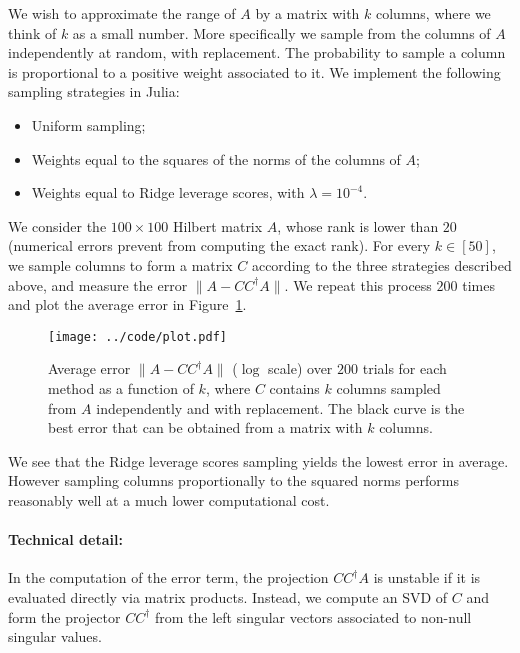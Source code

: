 \documentclass{article}
\begin{document}
We wish to approximate the range of $A$ by a matrix with $k$ columns, where we
think of $k$ as a small number.
More specifically we sample from the columns of $A$ independently at random,
with replacement.
The probability to sample a column is proportional to a positive weight
associated to it.
We implement the following sampling strategies in Julia:
\begin{itemize}
\item Uniform sampling;
\item Weights equal to the squares of the norms of the columns of $A$;
\item Weights equal to Ridge leverage scores, with $\lambda = 10^{-4}$.
\end{itemize}
We consider the $100 \times 100$ Hilbert matrix $A$, whose rank is lower than
$20$ (numerical errors prevent from computing the exact rank).
For every $k \in [50]$, we sample columns to form a matrix $C$ according to the
three strategies described above, and measure the error $\|A - C C^\dagger A\|$.
We repeat this process $200$ times and plot the average error in
Figure~\ref{fig:stratcomp}.
\begin{figure}[h!]
  \centering
  \begin{minipage}[b]{\textwidth}
    \texttt{[image: ../code/plot.pdf]}
  \end{minipage}
  \caption{
    Average error $\|A - C C^\dagger A\|$ ($\log$ scale) over $200$ trials for
    each method as a function of $k$, where $C$ contains $k$ columns sampled
    from $A$ independently and with replacement.
    The black curve is the best error that can be obtained from a matrix with
    $k$ columns.
  }\label{fig:stratcomp}
\end{figure}
We see that the Ridge leverage scores sampling yields the lowest error in
average.
However sampling columns proportionally to the squared norms performs reasonably
well at a much lower computational cost.

\paragraph{Technical detail:}
In the computation of the error term, the projection $C C^\dagger A$ is unstable
if it is evaluated directly via matrix products.
Instead, we compute an SVD of $C$ and form the projector $C C^\dagger$ from the
left singular vectors associated to non-null singular values.




\end{document}
